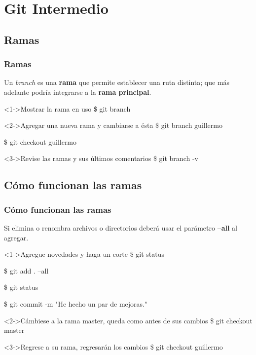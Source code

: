 %
%
%

\section{Git Intermedio}

\subsection{Ramas}
\begin{frame}
  \frametitle{Ramas}
  Un \textit{branch} es una \textbf{rama} que permite establecer una ruta distinta; que más adelante podría integrarse a la \textbf{rama principal}.
  \begin{block}<1->{Mostrar la rama en uso}
    \$ git branch\par
  \end{block}
  \begin{block}<2->{Agregar una nueva rama y cambiarse a ésta}
    \$ git branch guillermo\par
    \$ git checkout guillermo
  \end{block}
  \begin{block}<3->{Revise las ramas y sus últimos comentarios}
    \$ git branch -v
  \end{block}
\end{frame}

\subsection{Cómo funcionan las ramas}
\begin{frame}
  \frametitle{Cómo funcionan las ramas}
  Si elimina o renombra archivos o directorios deberá usar el parámetro \textbf{--all} al agregar.
  \begin{block}<1->{Agregue novedades y haga un corte}
    \$ git status\par
    \$ git add . --all\par
    \$ git status\par
    \$ git commit -m "He hecho un par de mejoras."\par
  \end{block}
  \begin{block}<2->{Cámbiese a la rama master, queda como antes de sus cambios}
    \$ git checkout master
  \end{block}
  \begin{block}<3->{Regrese a su rama, regresarán los cambios}
    \$ git checkout guillermo
  \end{block}
\end{frame}

